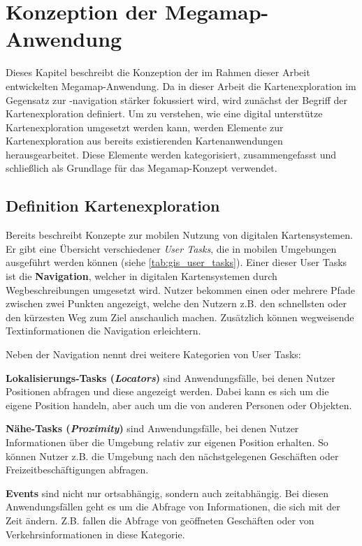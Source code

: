 \chapter{Konzeption der Megamap-Anwendung}
\label{chap:concept}
Dieses Kapitel beschreibt die Konzeption der im Rahmen dieser Arbeit entwickelten Megamap-Anwendung.
Da in dieser Arbeit die Kartenexploration im Gegensatz zur -navigation stärker fokussiert wird, wird zunächst der Begriff der Kartenexploration definiert.
Um zu verstehen, wie eine digital unterstütze Kartenexploration umgesetzt werden kann, werden Elemente zur Kartenexploration aus bereits existierenden Kartenanwendungen herausgearbeitet.
Diese Elemente werden kategorisiert, zusammengefasst und schließlich als Grundlage für das Megamap-Konzept verwendet.

\section{Definition Kartenexploration}
\label{sec:definition_exploration}
Bereits \textcite{Reichenbacher2001} beschreibt Konzepte zur mobilen Nutzung von digitalen Kartensystemen.
Er gibt eine Übersicht verschiedener \emph{User Tasks}, die in mobilen Umgebungen ausgeführt werden können (siehe \autoref{tab:gis_user_tasks}).
Einer dieser User Tasks ist die \textbf{Navigation}, welcher in digitalen Kartensystemen durch Wegbeschreibungen umgesetzt wird.
Nutzer bekommen einen oder mehrere Pfade zwischen zwei Punkten angezeigt, welche den Nutzern z.B. den schnellsten oder den kürzesten Weg zum Ziel anschaulich machen.
Zusätzlich können wegweisende Textinformationen die Navigation erleichtern.

Neben der Navigation nennt \citeauthor{Reichenbacher2001} drei weitere Kategorien von User Tasks:

\textbf{Lokalisierungs-Tasks (\emph{Locators})} sind Anwendungsfälle, bei denen Nutzer Positionen abfragen und diese angezeigt werden.
Dabei kann es sich um die eigene Position handeln, aber auch um die von anderen Personen oder Objekten.

\textbf{Nähe-Tasks (\emph{Proximity})} sind Anwendungsfälle, bei denen Nutzer Informationen über die Umgebung relativ zur eigenen Position erhalten.
So können Nutzer z.B. die Umgebung nach den nächstgelegenen Geschäften oder Freizeitbeschäftigungen abfragen.

\textbf{Events} sind nicht nur ortsabhängig, sondern auch zeitabhängig.
Bei diesen Anwendungsfällen geht es um die Abfrage von Informationen, die sich mit der Zeit ändern.
Z.B. fallen die Abfrage von geöffneten Geschäften oder von Verkehrsinformationen in diese Kategorie.

